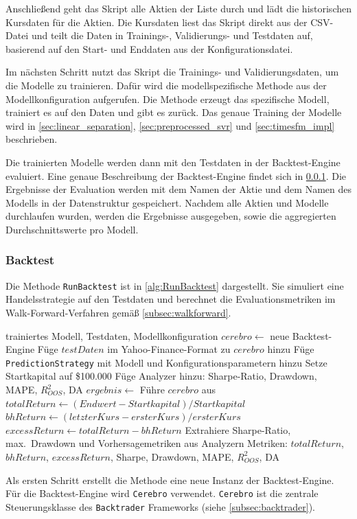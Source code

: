 Anschließend geht das Skript alle Aktien der Liste durch und lädt die historischen Kursdaten für die Aktien. Die Kursdaten liest das Skript direkt aus der CSV-Datei und teilt die Daten in Trainings-, Validierungs- und Testdaten auf, basierend auf den Start- und Enddaten aus der Konfigurationsdatei.

Im nächsten Schritt nutzt das Skript die Trainings- und Validierungsdaten, um die Modelle zu trainieren. Dafür wird die modellspezifische Methode aus der Modellkonfiguration aufgerufen. Die Methode erzeugt das spezifische Modell, trainiert es auf den Daten und gibt es zurück. Das genaue Training der Modelle wird in \cref{sec:linear_separation}, \cref{sec:preprocessed_svr} und \cref{sec:timesfm_impl} beschrieben.

Die trainierten Modelle werden dann mit den Testdaten in der Backtest-Engine evaluiert. Eine genaue Beschreibung der Backtest-Engine findet sich in \cref{subsubsec:backtest}. Die Ergebnisse der Evaluation werden mit dem Namen der Aktie und dem Namen des Modells in der Datenstruktur gespeichert. Nachdem alle Aktien und Modelle durchlaufen wurden, werden die Ergebnisse ausgegeben, sowie die aggregierten Durchschnittswerte pro Modell.

\subsubsection{Backtest}\label{subsubsec:backtest}
Die Methode \texttt{RunBacktest} ist in \cref{alg:RunBacktest} dargestellt. Sie simuliert eine Handelsstrategie auf den Testdaten und berechnet die Evaluationsmetriken im Walk-Forward-Verfahren gemäß \cref{subsec:walkforward}.
\begin{algorithm}
    \caption{RunBacktest Methode}\label{alg:RunBacktest}
    \small
    \begin{algorithmic}[1]
        \Require trainiertes Modell, Testdaten, Modellkonfiguration
        \State $cerebro \gets$ neue Backtest-Engine
        \State Füge $testDaten$ im Yahoo-Finance-Format zu $cerebro$ hinzu
        \State Füge \texttt{PredictionStrategy} mit Modell und Konfigurationsparametern hinzu
        \State Setze Startkapital auf \$100.000
        \State Füge Analyzer hinzu: Sharpe-Ratio, Drawdown, MAPE, $R^2_{OOS}$, DA
        \State $ergebnis \gets$ Führe $cerebro$ aus
        \State $totalReturn \gets (Endwert - Startkapital) / Startkapital$
        \State $bhReturn \gets (letzterKurs - ersterKurs) / ersterKurs$
        \State $excessReturn \gets totalReturn - bhReturn$
        \State Extrahiere Sharpe-Ratio, max.\ Drawdown und Vorhersagemetriken aus Analyzern
        \State \Return Metriken: $totalReturn$, $bhReturn$, $excessReturn$, Sharpe, Drawdown, MAPE, $R^2_{OOS}$, DA
    \end{algorithmic}
\end{algorithm}
Als ersten Schritt erstellt die Methode eine neue Instanz der Backtest-Engine. Für die Backtest-Engine wird \texttt{Cerebro} verwendet. \texttt{Cerebro} ist die zentrale Steuerungsklasse des \texttt{Backtrader} Frameworks (siehe \cref{subsec:backtrader}).

